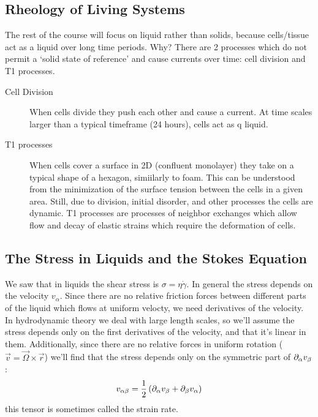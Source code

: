 \subsection{Rheology of Living Systems}
The rest of the course will focus on liquid rather than solids, because cells/tissue act as a liquid over long time periods. Why? There are 2 processes which do not permit a `solid state of reference' and cause currents over time: cell division and T1 processes.
\begin{description}
    \item[Cell Division] When cells divide they push each other and cause a current. At time scales larger than a typical timeframe (24 hours), cells act as q liquid.
    \item[T1 processes] When cells cover a surface in 2D (confluent monolayer) they take on a typical shape of a hexagon, simiilarly to foam. This can be understood from the minimization of the surface tension between the cells in a given area. Still, due to division, initial disorder, and other processes the cells are dynamic. T1 processes are processes of neighbor exchanges which allow flow and decay of elastic strains which require the deformation of cells.
\end{description}
\subsection{The Stress in Liquids and the Stokes Equation}
We saw that in liquids the shear stress is \(\sigma = \eta\dot{\gamma}\). In general the stress depends on the velocity \(v_\alpha \). Since there are no relative friction forces between different parts of the liquid which flows at uniform velocty, we need derivatives of the velocity. In hydrodynamic theory we deal with large length scales, so we'll assume the stress depends only on the first derivatives of the velocity, and that it's linear in them. Additionally, since there are no relative forces in uniform rotation (\(\vec{v} = \vec{\Omega}\times\vec{r}\)) we'll find that the stress depends only on the symmetric part of \(\partial_\alpha v_\beta \):
\begin{equation}
    v_{\alpha\beta} = \frac{1}{2} \left(\partial_\alpha v_\beta + \partial_\beta v_\alpha\right)
\end{equation}
this tensor is sometimes called the strain rate.